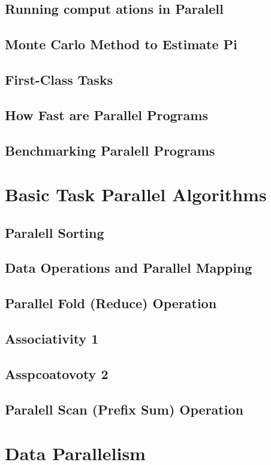 \documentclass[10pt, a4paper]{report}
\begin{document}
\section{Running comput  ations in Paralell}
\section{Monte Carlo Method to Estimate Pi}
\section{First-Class Tasks}
\section{How Fast are Parallel Programs}
\section{Benchmarking Paralell Programs}

\chapter{Basic Task Parallel Algorithms}
\section{Paralell Sorting}
\section{Data Operations and Parallel Mapping}
\section{Parallel Fold (Reduce) Operation}
\section{Associativity 1}
\section{Asspcoatovoty 2}
\section{Paralell Scan (Prefix Sum) Operation}


\chapter{Data Parallelism}
\end{document}
